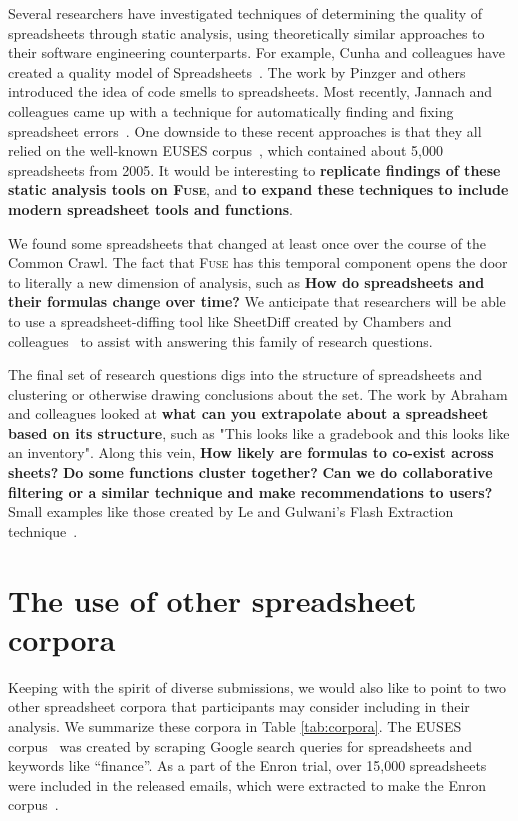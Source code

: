 \documentclass[conference]{IEEEtran}
\begin{document}
Several researchers have investigated techniques of determining the quality of spreadsheets through static analysis, using theoretically similar approaches to their software engineering counterparts.
For example, Cunha and colleagues have created a quality model of Spreadsheets~\cite{Cunha2012}.
The work by Pinzger and others introduced the idea of code smells to spreadsheets\cite{Pinzger2012}.
Most recently, Jannach and colleagues came up with a technique for automatically finding and fixing spreadsheet errors~\cite{jannach2014}.
One downside to these recent approaches is that they all relied on the well-known EUSES corpus~\cite{Fisher2005}, which contained about 5,000 spreadsheets from 2005.
It would be interesting to \textbf{replicate findings of these static analysis tools on \textsc{Fuse}}, and \textbf{to expand these techniques to include modern spreadsheet tools and functions}.

We found some spreadsheets that changed at least once over the course of the Common Crawl.
The fact that \textsc{Fuse} has this temporal component opens the door to literally a new dimension of analysis, such as \textbf{How do spreadsheets and their formulas change over time?}
We anticipate that researchers will be able to use a spreadsheet-diffing tool like SheetDiff created by Chambers and colleagues~\cite{chambers2010} to assist with answering this family of research questions.

The final set of research questions digs into the structure of spreadsheets and clustering or otherwise drawing conclusions about the set.
The work by Abraham and colleagues \cite{Abraham2006} looked at \textbf{what can you extrapolate about a spreadsheet based on its structure}, such as "This looks like a gradebook and this looks like an inventory".
Along this vein, \textbf{How likely are formulas to co-exist across sheets?} 
\textbf{Do some functions cluster together? }
\textbf{Can we do collaborative filtering or a similar technique and make recommendations to users? }
Small examples like those created by Le and Gulwani's Flash Extraction technique~\cite{le2014}.  



\section{The use of other spreadsheet corpora}
Keeping with the spirit of diverse submissions, we would also like to point to two other spreadsheet corpora that participants may consider including in their analysis.
We summarize these corpora in Table \ref{tab:corpora}.
The EUSES corpus~\cite{Fisher2005} was created by scraping Google search queries for spreadsheets and keywords like ``finance''.
As a part of the Enron trial, over 15,000 spreadsheets were included in the released emails, which were extracted to make the Enron corpus~\cite{Hermans2015}.
\end{document}
